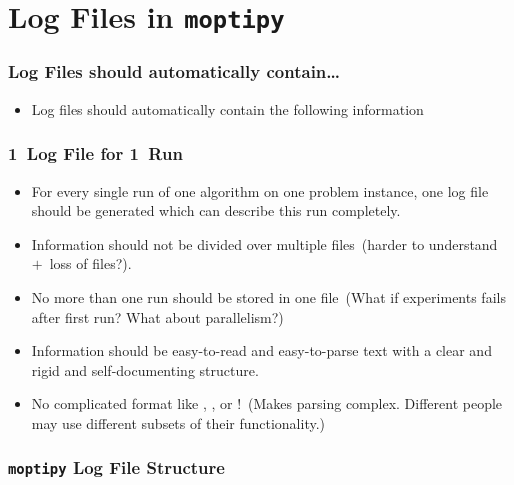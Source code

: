 \documentclass[aspectratio=169,mathserif,notheorems]{beamer}%
\begin{document}
\section{Log Files in \texttt{moptipy}}%
%
\begin{frame}%
\frametitle{Log Files should automatically contain\dots}%
\begin{itemize}%
\item Log files should automatically contain the following information%
\end{itemize}%
\end{frame}%
%
\begin{frame}%
\frametitle{1~Log File for 1~Run}%
\begin{itemize}%
\item For every single run of one algorithm on one problem instance, one log file should be generated which can describe this run completely.%
%
\item<2-> Information should not be divided over multiple files~(harder to understand~$+$~loss of files?).%
%
\item<3-> No more than one run should be stored in one file~(What if experiments fails after first run? What about parallelism?)%
%
\item<4-> Information should be easy-to-read and easy-to-parse text with a clear and rigid and self-documenting structure.%
%
\item<5-> No complicated format like , , or !~(Makes parsing complex. Different people may use different subsets of their functionality.)%
\end{itemize}%
\end{frame}%
%
\begin{frame}%
\frametitle{\texttt{moptipy} Log File Structure}%
%
\end{frame}%
%
\end{document}
